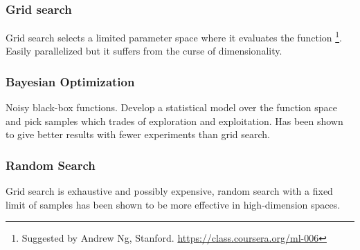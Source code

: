 \subsubsection{Grid search}

Grid search selects a limited parameter space where it evaluates the function \footnote{Suggested by Andrew Ng, Stanford. \url{https://class.coursera.org/ml-006}}. Easily parallelized but it suffers from the curse of dimensionality.


\subsubsection{Bayesian Optimization}

Noisy black-box functions. Develop a statistical model over the function space and pick samples which trades of exploration and exploitation. Has been shown \citep{snoek2012practical} to give better results with fewer experiments than grid search.


\subsubsection{Random Search}

Grid search is exhaustive and possibly expensive, random search with a fixed limit of samples has been shown to be more effective in high-dimension spaces. \citep{bergstra2012random}




